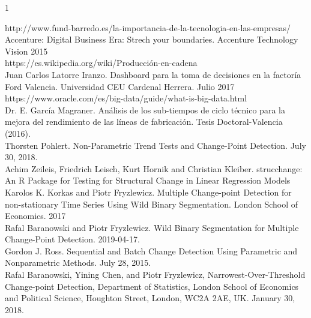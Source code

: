 \documentclass[runningheads,a4paper,12pt]{report}
\begin{document}
\begin{thebibliography}{1}



http://www.fund-barredo.es/la-importancia-de-la-tecnologia-en-las-empresas/\\

Accenture: Digital Business Era: Strech your boundaries. Accenture Technology Vision 2015\\

https://es.wikipedia.org/wiki/Producción-en-cadena\\

Juan Carlos Latorre Iranzo. Dashboard para la toma de decisiones en la factoría Ford Valencia. Universidad CEU Cardenal Herrera. Julio 2017\\

https://www.oracle.com/es/big-data/guide/what-is-big-data.html\\

Dr. E. García Magraner. Análisis de los sub-tiempos de ciclo técnico para la mejora del rendimiento de las líneas de fabricación. Tesis Doctoral-Valencia (2016).\\

Thorsten Pohlert. Non-Parametric Trend Tests and Change-Point Detection. July 30, 2018.\\

Achim Zeileis, Friedrich Leisch, Kurt Hornik and Christian Kleiber. strucchange: An R Package for Testing for Structural Change in Linear Regression Models\\

Karolos K. Korkas and Piotr Fryzlewicz. Multiple Change-point Detection for non-stationary Time Series Using Wild Binary Segmentation. London School of Economics. 2017\\

Rafal Baranowski and Piotr Fryzlewicz. Wild Binary Segmentation for Multiple Change-Point Detection. 2019-04-17.\\

Gordon J. Ross. Sequential and Batch Change Detection Using Parametric and Nonparametric Methods. July 28, 2015.\\

Rafal Baranowski, Yining Chen, and Piotr Fryzlewicz, Narrowest-Over-Threshold Change-point Detection, Department of Statistics, London School of Economics and Political Science, Houghton Street, London, WC2A 2AE, UK. January 30, 2018.\\


\end{thebibliography}
\end{document}
